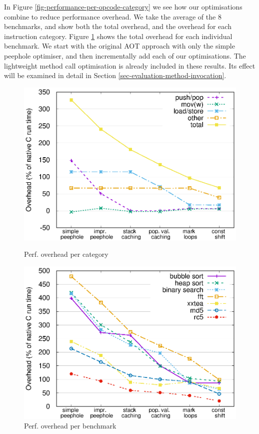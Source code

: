 In Figure \ref{fig-performance-per-opcode-category} we see how our optimisations combine to reduce performance overhead. We take the average of the 8 benchmarks, and show both the total overhead, and the overhead for each instruction category. Figure \ref{fig-performance-per-benchmark} shows the total overhead for each individual benchmark. We start with the original AOT approach with only the simple peephole optimiser, and then incrementally add each of our optimisations. The lightweight method call optimisation is already included in these results. Its effect will be examined in detail in Section \ref{sec-evaluation-method-invocation}.

\begin{figure}
 \centering
 \begin{minipage}{0.45\textwidth}
  \centering
  \includegraphics[width=\myfiguresizeperformance]{performance-per-opcode-category.eps}
  \caption{Perf. overhead per category}
  \label{fig-performance-per-opcode-category}
 \end{minipage}\hfill
 \begin{minipage}{0.45\textwidth}
  \centering
  \includegraphics[width=\myfiguresizeperformance]{performance-per-benchmark.eps}
  \caption{Perf. overhead per benchmark}
  \label{fig-performance-per-benchmark}
 \end{minipage}
\end{figure}

